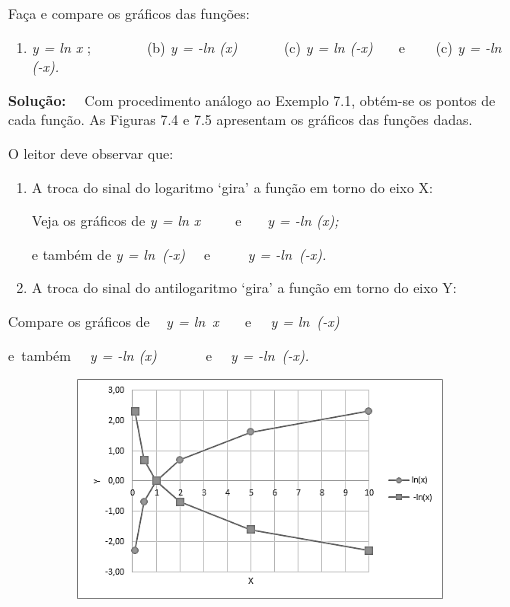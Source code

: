 \begin{texemplo}
    Faça e compare os gráficos das funções: 

    \begin{enumerate}
	    \item \textit{y = ln x} ;~~~~~~~~(b)  \textit{y = -ln (x)}~~~~~~ \quad (c) \textit{y = ln (-x)~~~ }e\textit{~~ }~ (c) \textit{y = -ln (-x).~ }~ 
    \end{enumerate}

    \textbf{Solução:}~~ Com procedimento análogo ao Exemplo 7.1, obtém-se os pontos de cada função. As Figuras 7.4 e 7.5 apresentam os gráficos das funções dadas.

    O leitor deve observar que:

    \begin{enumerate}
	    \item A troca do sinal do logaritmo ‘gira’ a função em torno do eixo X: 

        Veja os gráficos de \textit{y = ln x}~~~~~e~~~  \textit{y = -ln (x); }

        e também de\textit{ y = ln~(-x)~~  }e\textit{~~ }~~ \textit{y = -ln~(-x).  }~ 

	    \item  A troca do sinal do antilogaritmo ‘gira’ a função em torno do eixo Y:
    \end{enumerate}

    Compare os gráficos de ~ \textit{y = ln~x~~~  }e\textit{~~ y = ln~(-x)  }

    e~também~~  \textit{y = -ln (x)}~~~~~~~e~~  \textit{y = -ln~(-x).  }~ 

    \begin{figure}[H]
        \begin{Center}
            \includegraphics[width=4.49in,height=2.29in]{capitulos/logaritmos_e_funcao_logaritmica/media/image8.png}
        \end{Center}
    \end{figure}


\end{texemplo}
